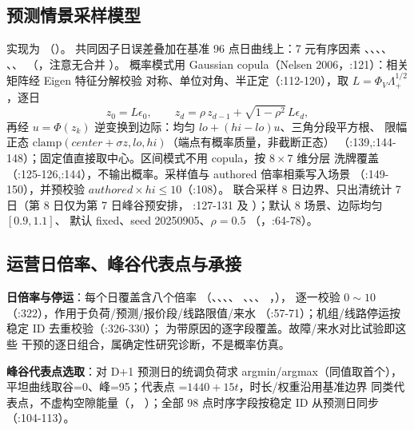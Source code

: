 \subsection{预测情景采样模型}
实现为 （）。
共同因子日误差叠加在基准 96 点日曲线上：7 元有序因素
、、、、
、、
（，注意无合并 ）。
概率模式用 Gaussian copula（Nelsen 2006，:121）：相关矩阵经 Eigen 特征分解校验
对称、单位对角、半正定（:112-120），取 $L=\Phi_V\Lambda_+^{1/2}$，逐日
\begin{equation}
 z_0=L\epsilon_0,\qquad z_d=\rho\,z_{d-1}+\sqrt{1-\rho^2}\,L\epsilon_d,
\end{equation}
再经 $u=\Phi(z_k)$ 逆变换到边际：均匀 $lo+(hi-lo)u$、三角分段平方根、
限幅正态 $\mathrm{clamp}(center+\sigma z,lo,hi)$（端点有概率质量，非截断正态）
（:139,:144-148）；固定值直接取中心。区间模式不用 copula，按 $8\times7$ 维分层
洗牌覆盖（:125-126,:144），不输出概率。采样值与 authored 倍率相乘写入场景
（:149-150），并预校验 $authored\times hi\le10$（:108）。
联合采样 8 日边界、只出清统计 7 日（第 8 日仅为第 7 日峰谷预安排，
:127-131 及 ）；默认 8 场景、边际均匀 $[0.9,1.1]$、
 默认 fixed、seed 20250905、$\rho=0.5$
（，:64-78）。

\subsection{运营日倍率、峰谷代表点与承接}
\textbf{日倍率与停运}：每个日覆盖含八个倍率
（、、、、
、、、
，），
逐一校验 $0\sim10$（:322），作用于负荷/预测/报价段/线路限值/来水
（:57-71）；机组/线路停运按稳定 ID 去重校验（:326-330）；
 为带原因的逐字段覆盖。故障/来水对比试验即这些
干预的逐日组合，属确定性研究诊断，不是概率仿真。

\textbf{峰谷代表点选取}：对 D+1 预测日的统调负荷求 argmin/argmax（同值取首个），
平坦曲线取谷=0、峰=95；代表点 =$1440+15t$，时长/权重沿用基准边界
同类代表点，不虚构空隙能量（，
）；全部 98 点时序字段按稳定 ID
从预测日同步（:104-113）。

